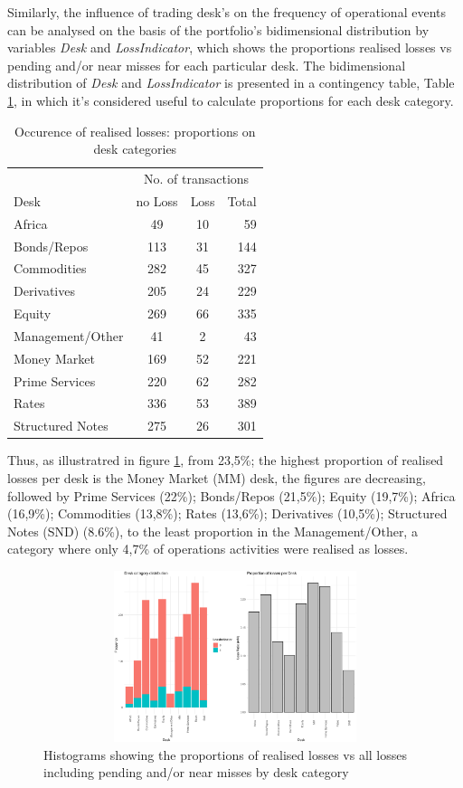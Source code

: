 \documentclass[]{DissertateUSU}
\begin{document}
Similarly, the influence of trading desk's on the frequency of
operational events can be analysed on the basis of the portfolio's
bidimensional distribution by variables \emph{Desk} and
\emph{LossIndicator}, which shows the proportions realised losses vs
pending and/or near misses for each particular desk. The bidimensional
distribution of \emph{Desk} and \emph{LossIndicator} is presented in a
contingency table, Table \ref{tab_Desk_Prop}, in which it's considered
useful to calculate proportions for each desk category.

\begin{table}[ht]
\centering
\caption{Occurence of realised losses: proportions on desk categories}
\begin{tabular}{lccr}
\toprule
  & \multicolumn{3}{c}{No. of transactions} \\
Desk   & no Loss   & Loss & Total\\ 
\midrule
  Africa            &  49 & 10 &  59 \\
  Bonds/Repos       & 113 & 31 & 144 \\
  Commodities       & 282 & 45 & 327 \\
  Derivatives       & 205 & 24 & 229 \\
  Equity            & 269 & 66 & 335 \\
  Management/Other  &  41 &  2 &  43 \\
  Money Market      & 169 & 52 & 221 \\
  Prime Services    & 220 & 62 & 282 \\
  Rates             & 336 & 53 & 389 \\
  Structured Notes  & 275 & 26 & 301 \\
 \bottomrule
\end{tabular}\label{tab_Desk_Prop}
\end{table}

Thus, as illustratred in figure \ref{Desk_Proportions}, from 23,5\%; the
highest proportion of realised losses per desk is the Money Market (MM)
desk, the figures are decreasing, followed by Prime Services (22\%);
Bonds/Repos (21,5\%); Equity (19,7\%); Africa (16,9\%); Commodities
(13,8\%); Rates (13,6\%); Derivatives (10,5\%); Structured Notes (SND)
(8.6\%), to the least proportion in the Management/Other, a category
where only 4,7\% of operations activities were realised as losses.

\begin{figure}
\centering
\includegraphics[width=20cm,height=5cm]{Exploratory_Desk_Proportions.eps}
\caption[Desk category by realised losses]{Histograms showing the proportions of realised losses vs all losses including pending and/or near misses by desk category}
\label{Desk_Proportions}
\end{figure}
\end{document}
